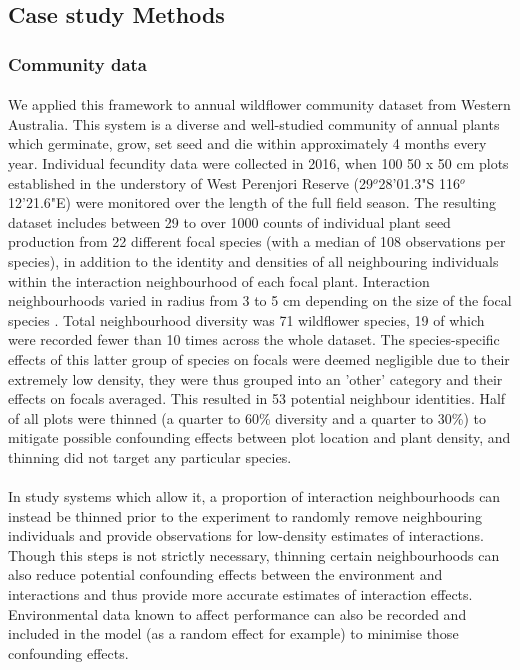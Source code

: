 \documentclass[a4,12pt]{article}
\begin{document}



    \subsection{Case study Methods}
    \label{SI:casestudy}

        \subsubsection{Community data}

        \paragraph{}
        We applied this framework to annual wildflower community dataset from Western Australia. This system is a diverse and well-studied community of annual plants which germinate, grow, set seed and die within approximately 4 months every year. Individual fecundity data were collected in 2016, when 100 50 x 50 cm plots established in the understory of West Perenjori Reserve (29$^o$28'01.3"S 116$^o$12'21.6"E) were monitored over the length of the full field season. The resulting dataset includes between 29 to over 1000 counts of individual plant seed production from 22 different focal species (with a median of 108 observations per species), in addition to the identity and densities of all neighbouring individuals within the interaction neighbourhood of each focal plant. Interaction neighbourhoods varied in radius from 3 to 5 cm depending on the size of the focal species \parencite{Martyn2020}. Total neighbourhood diversity was 71 wildflower species, 19 of which were recorded fewer than 10 times across the whole dataset. The species-specific effects of this latter group of species on focals were deemed negligible due to their extremely low density, they were thus grouped into an 'other' category and their effects on focals averaged. This resulted in 53 potential neighbour identities. Half of all plots were thinned (a quarter to 60\% diversity and a quarter to 30\%) to mitigate possible confounding effects between plot location and plant density, and thinning did not target any particular species. 

        \paragraph{}
    	In study systems which allow it, a proportion of interaction neighbourhoods can instead be thinned prior to the experiment to randomly remove neighbouring individuals and provide observations for low-density estimates of interactions. Though this steps is not strictly necessary, thinning certain neighbourhoods can also reduce potential confounding effects between the environment and interactions and thus provide more accurate estimates of interaction effects. Environmental data known to affect performance can also be recorded and included in the model (as a random effect for example) to minimise those confounding effects.
\end{document}
